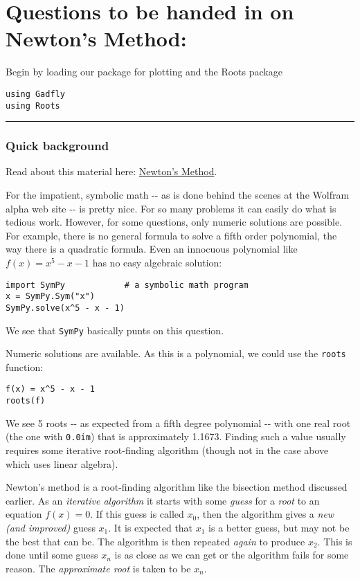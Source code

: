 \documentclass[12pt]{article}
\begin{document}
\section{Questions to be handed in on Newton's Method:}

Begin by loading our package for plotting and the Roots package



\begin{verbatim}
using Gadfly            
using Roots
\end{verbatim}
\begin{center}\rule{3in}{0.4pt}\end{center}

\subsubsection{Quick background}

Read about this material here:
\href{http://mth229.github.io/newton.html}{Newton's Method}.

For the impatient, symbolic math -{}- as is done behind the scenes at
the Wolfram alpha web site -{}- is pretty nice. For so many problems it
can easily do what is tedious work. However, for some questions, only
numeric solutions are possible. For example, there is no general formula
to solve a fifth order polynomial, the way there is a quadratic formula.
Even an innocuous polynomial like $f(x) = x^5 - x - 1$ has no easy
algebraic solution:



\begin{verbatim}
import SymPy            # a symbolic math program
x = SymPy.Sym("x")
SymPy.solve(x^5 - x - 1)
\end{verbatim}
We see that \texttt{SymPy} basically punts on this question.

Numeric solutions are available. As this is a polynomial, we could use
the \texttt{roots} function:



\begin{verbatim}
f(x) = x^5 - x - 1
roots(f)
\end{verbatim}
We see 5 roots -{}- as expected from a fifth degree polynomial -{}- with
one real root (the one with \texttt{0.0im}) that is approximately
1.1673. Finding such a value usually requires some iterative
root-finding algorithm (though not in the case above which uses linear
algebra).

Newton's method is a root-finding algorithm like the bisection method
discussed earlier. As an \emph{iterative algorithm} it starts with some
\emph{guess} for a \emph{root} to an equation $f(x) = 0$. If this guess
is called $x_0$, then the algorithm gives a \emph{new (and improved)}
guess $x_1$. It is expected that $x_1$ is a better guess, but may not be
the best that can be. The algorithm is then repeated \emph{again} to
produce $x_2$. This is done until some guess $x_n$ is as close as we can
get or the algorithm fails for some reason. The \emph{approximate root}
is taken to be $x_n$.
\end{document}
